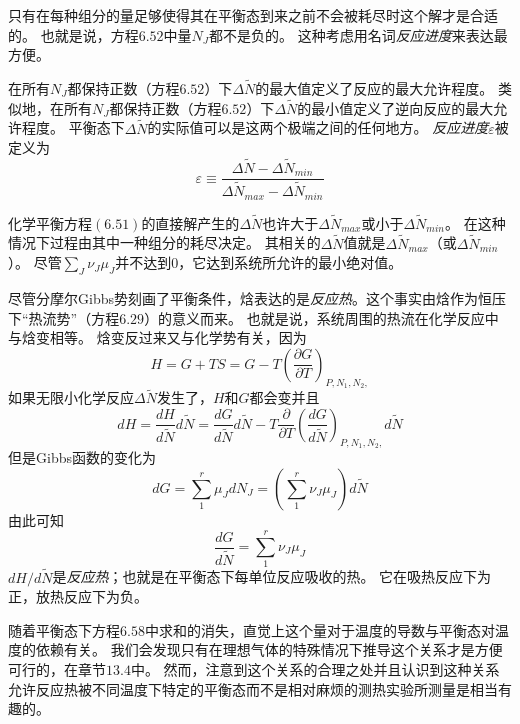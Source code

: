 只有在每种组分的量足够使得其在平衡态到来之前不会被耗尽时这个解才是合适的。
也就是说，方程$6.52$中量$N_J$都不是负的。
这种考虑用名词\emph{反应进度}来表达最方便。

在所有$N_J$都保持正数（方程$6.52$）下$\Delta\tilde{N}$的最大值定义了反应的最大允许程度。
类似地，在所有$N_J$都保持正数（方程$6.52$）下$\Delta\tilde{N}$的最小值定义了逆向反应的最大允许程度。
平衡态下$\Delta\tilde{N}$的实际值可以是这两个极端之间的任何地方。
\emph{反应进度}$\varepsilon$被定义为
\begin{equation}
\label{equ6.53}
\varepsilon \equiv \frac{\Delta\tilde{N}-\Delta\tilde{N}_{min}}{\Delta\tilde{N}_{max}-\Delta\tilde{N}_{min}}
\end{equation}

化学平衡方程$(6.51)$的直接解产生的$\Delta\tilde{N}$也许大于$\Delta\tilde{N}_{max}$或小于$\Delta\tilde{N}_{min}$。
在这种情况下过程由其中一种组分的耗尽决定。
其相关的$\Delta\tilde{N}$值就是$\Delta\tilde{N}_{max}$（或$\Delta\tilde{N}_{min}$）。
尽管$\sum_{J}\nu_{J}\mu_{J}$并不达到$0$，它达到系统所允许的最小绝对值。

尽管分摩尔Gibbs势刻画了平衡条件，焓表达的是\emph{反应热}。这个事实由焓作为恒压下“热流势”（方程$6.29$）的意义而来。
也就是说，系统周围的热流在化学反应中与焓变相等。
焓变反过来又与化学势有关，因为
\begin{equation}
\label{equ6.54}
H=G+TS=G-T\left(\frac{\partial G}{\partial T}\right)_{P, N_1, N_2,}
\end{equation}
如果无限小化学反应$\Delta\tilde{N}$发生了，$H$和$G$都会变并且
\begin{equation}
\label{equ6.55}
dH=\frac{dH}{d\tilde{N}}d\tilde{N}=\frac{dG}{d\tilde{N}}d\tilde{N}-T\frac{\partial}{\partial T}\left(\frac{dG}{d\tilde{N}}\right)_{P, N_1, N_2,}d\tilde{N}
\end{equation}
但是Gibbs函数的变化为
\begin{equation}
\label{equ6.56}
dG=\sum_{1}^{r}\mu_JdN_J=\left(\sum_1^r \nu_J\mu_J \right)d\tilde{N}
\end{equation}
由此可知
\begin{equation}
\label{equ6.57}
\frac{dG}{d\tilde{N}}=\sum_1^r \nu_J\mu_J
\end{equation}
$dH/d\tilde{N}$是\emph{反应热}；也就是在平衡态下每单位反应吸收的热。
它在吸热反应下为正，放热反应下为负。

随着平衡态下方程$6.58$中求和的消失，直觉上这个量对于温度的导数与平衡态对温度的依赖有关。
我们会发现只有在理想气体的特殊情况下推导这个关系才是方便可行的，在章节$13.4$中。
然而，注意到这个关系的合理之处并且认识到这种关系允许反应热被不同温度下特定的平衡态而不是相对麻烦的测热实验所测量是相当有趣的。

